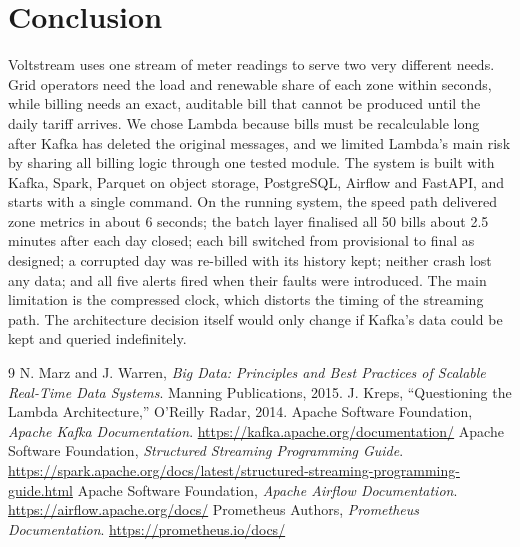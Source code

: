 \documentclass[11pt,a4paper]{article}
\begin{document}
\section{Conclusion}
\label{sec:conclusion}

Voltstream uses one stream of meter readings to serve two very different needs. Grid
operators need the load and renewable share of each zone within seconds, while billing needs
an exact, auditable bill that cannot be produced until the daily tariff arrives. We chose
Lambda because bills must be recalculable long after Kafka has deleted the original
messages, and we limited Lambda's main risk by sharing all billing logic through one tested
module. The system is built with Kafka, Spark, Parquet on object storage, PostgreSQL, Airflow
and FastAPI, and starts with a single command. On the running system, the speed path
delivered zone metrics in about 6 seconds; the batch layer finalised all 50 bills about 2.5
minutes after each day closed; each bill switched from provisional to final as designed; a
corrupted day was re-billed with its history kept; neither crash lost any data; and all five
alerts fired when their faults were introduced. The main limitation is the compressed clock,
which distorts the timing of the streaming path. The architecture decision itself would only
change if Kafka's data could be kept and queried indefinitely.

{}
\begin{thebibliography}{9}
\small
{}
N. Marz and J. Warren, \emph{Big Data: Principles and Best Practices of Scalable Real-Time
Data Systems}. Manning Publications, 2015.
J. Kreps, ``Questioning the Lambda Architecture,'' O'Reilly Radar, 2014.
Apache Software Foundation, \emph{Apache Kafka Documentation}.
\url{https://kafka.apache.org/documentation/}
Apache Software Foundation, \emph{Structured Streaming Programming Guide}.
\url{https://spark.apache.org/docs/latest/structured-streaming-programming-guide.html}
Apache Software Foundation, \emph{Apache Airflow Documentation}.
\url{https://airflow.apache.org/docs/}
Prometheus Authors, \emph{Prometheus Documentation}. \url{https://prometheus.io/docs/}
\end{thebibliography}

\clearpage
{}
{}
\end{document}
